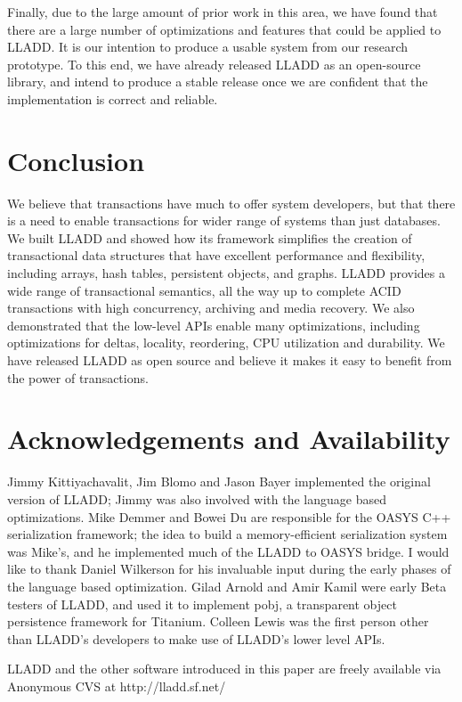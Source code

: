 \documentclass[10pt,letterpaper,twocolumn,english]{article}
\newcommand{\yad}{LLADD\xspace}
\newcommand{\oasys}{OASYS\xspace}
\begin{document}
Finally, due to the large amount of prior work in this area, we have
found that there are a large number of optimizations and features that
could be applied to \yad.  It is our intention to produce a usable
system from our research prototype.  To this end, we have already
released \yad as an open-source library, and intend to produce a
stable release once we are confident that the implementation is correct
and reliable.  


\section{Conclusion}

We believe that transactions have much to offer system developers, but
that there is a need to enable transactions for wider range of systems
than just databases.  We built \yad and showed how its framework
simplifies the creation of transactional data structures that have
excellent performance and flexibility, including arrays, hash tables,
persistent objects, and graphs.  \yad provides a wide range of
transactional semantics, all the way up to complete ACID transactions with
high concurrency, archiving and media recovery.  We also demonstrated
that the low-level APIs enable many optimizations, including
optimizations for deltas, locality, reordering, CPU utilization and durability.  We
have released \yad as open source and believe it makes it easy to
benefit from the power of transactions.

\section{Acknowledgements and Availability}

Jimmy Kittiyachavalit, Jim Blomo and Jason Bayer implemented the
original version of \yad; Jimmy was also involved with the language
based optimizations. Mike Demmer and Bowei Du are responsible for the
\oasys C++ serialization framework; the idea to build a
memory-efficient serialization system was Mike's, and he implemented
much of the \yad to \oasys bridge. I would like to thank Daniel
Wilkerson for his invaluable input during the early phases of the
language based optimization.  Gilad Arnold and Amir Kamil were early
Beta testers of \yad, and used it to implement pobj, a transparent
object persistence framework for Titanium.  Colleen Lewis was the first
person other than \yad's developers to make use of \yad's lower level
APIs.

\yad and the other software introduced in this paper are freely
available via Anonymous CVS at http://lladd.sf.net/
\end{document}
